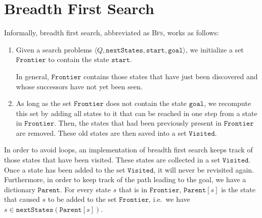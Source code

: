 \section{Breadth First Search}
Informally, breadth first search, abbreviated as \textsc{Bfs}, works as follows:
\begin{enumerate}
\item Given a search problems $\langle Q,\mathtt{nextStates}, \mathtt{start}, \mathtt{goal}\rangle$,
      we initialize a set $\mathtt{Frontier}$ to contain the state $\mathtt{start}$.

      In general, $\mathtt{Frontier}$ contains those states that have just been discovered and whose successors have not
      yet been seen.
\item As long as the set $\mathtt{Frontier}$ does not contain the state $\mathtt{goal}$, we recompute this set
      by adding all states to it that can be reached in one step from a state in $\mathtt{Frontier}$.
      Then, the states that had been previously present in $\mathtt{Frontier}$ are removed.
      These old states are then saved into a set $\mathtt{Visited}$.
\end{enumerate}
In order to avoid loops, an implementation of breadth first search keeps track of those states that have
been visited.  These states are collected in a set $\mathtt{Visited}$.  Once a state has been added to
the set $\mathtt{Visited}$,  it will never be revisited again.
Furthermore, in order to keep track of the path leading to the goal, we have a dictionary
$\mathtt{Parent}$.  For every state $s$ that is in $\mathtt{Frontier}$, $\mathtt{Parent}[s]$ is the state that
caused $s$ to be added to the set $\mathtt{Frontier}$, i.e.~we have
\\[0.2cm]
\hspace*{1.3cm}
$s \in \mathtt{nextStates}(\mathtt{Parent}[s])$.


